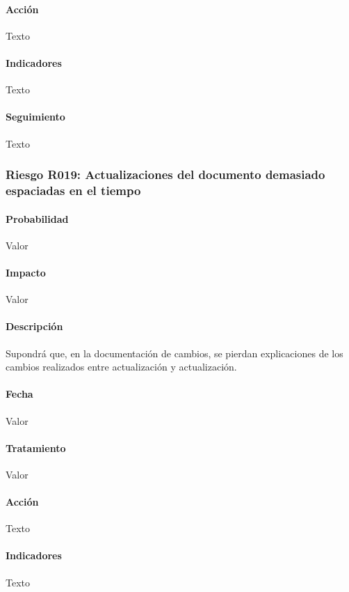 \documentclass[10pt,a4paper]{article}
\begin{document}
				\paragraph{Acción} Texto %
				\paragraph{Indicadores} Texto %
				\paragraph{Seguimiento}	Texto %
				\subsubsection{Riesgo R019: Actualizaciones del documento demasiado espaciadas en el tiempo}
				\paragraph{Probabilidad} Valor
				\paragraph{Impacto}	Valor
				\paragraph{Descripción} Supondrá que, en la documentación de cambios, se pierdan explicaciones de los cambios realizados entre actualización y actualización.
				\paragraph{Fecha} Valor %
				\paragraph{Tratamiento} Valor %
				\paragraph{Acción} Texto %
				\paragraph{Indicadores} Texto %
\end{document}
